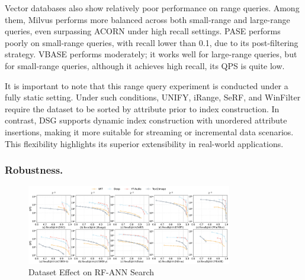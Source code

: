 \documentclass[sigconf, nonacm]{acmart}
\begin{document}
	Vector databases also show relatively poor performance on range queries. Among them, Milvus performs more balanced across both small-range and large-range queries, even surpassing ACORN under high recall settings. PASE performs poorly on small-range queries, with recall lower than 0.1, due to its post-filtering strategy. 
	VBASE performs moderately; it works well for large-range queries, but for small-range queries, although it achieves high recall, its QPS is quite  low.
	
	
	
	It is important to note that this range query experiment is conducted under a fully static setting. Under such conditions, UNIFY, iRange, SeRF, and WinFilter require the dataset to be sorted by attribute prior to index construction. In contrast, DSG  supports dynamic index construction with unordered attribute insertions, making it more suitable for streaming or incremental data scenarios. This flexibility highlights its superior extensibility in real-world applications.
	\subsubsection{Robustness.}
	
	
	\begin{figure}[htbp]
		\centering
		\includegraphics[width=0.80\textwidth]{figures/exp/exp_8_3.pdf}
		\caption{Dataset Effect on RF-ANN Search}
		\label{fig:exp_8_3}
	\end{figure}
	
\end{document}

